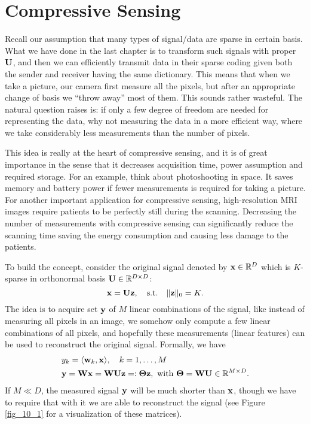 \documentclass[../book-template.tex]{subfiles}
\begin{document}
\section{Compressive Sensing}
Recall our assumption that many types of signal/data are sparse in certain basis. What we have done in the last chapter is to transform such signals with proper ${\bf U}$, and then we can efficiently transmit data in their sparse coding given both the sender and receiver having the same dictionary. This means that when we take a picture, our camera first measure all the pixels, but after an appropriate change of basis we ``throw away'' most of them. This sounds rather wasteful. The natural question raises is: if only a few degree of freedom are needed for representing the data, why not measuring the data in a more efficient way, where we take considerably less measurements than the number of pixels. 
\par This idea is really at the heart of compressive sensing, and it is of great importance in the sense that it decreases acquisition time, power assumption and required storage. For an example, think about photoshooting in space. It saves memory and battery power if fewer measurements is required for taking a picture. For another important application for compressive sensing, high-resolution MRI images require patients to be perfectly still during the scanning. Decreasing the number of measurements with compressive sensing can significantly reduce the scanning time saving the energy consumption and causing less damage to the patients.
\par To build the concept, consider the original signal denoted by ${\bf x}\in \mathbb{R}^D$ which is $K$-sparse in orthonormal basis ${\bf U}\in\mathbb{R}^{D\times D}$:
\begin{equation*}
	{\bf x}={\bf Uz},\quad {\rm s.t.}\quad \|{\bf z}\|_0=K.
\end{equation*}
The idea is to acquire set ${\bf y}$ of $M$ linear combinations of the signal, like instead of measuring all pixels in an image, we somehow only compute a few linear combinations of all pixels, and hopefully these measurements (linear features) can be used to reconstruct the original signal. Formally, we have
\begin{align*}
	&y_k=\langle {\bf w}_k,{\bf x}\rangle,\quad k=1,\dots,M\\
	&{\bf y}={\bf Wx}={\bf WUz}=:{\bf \Theta z},\ {\rm with}\ {\bf \Theta}={\bf WU}\in\mathbb{R}^{M\times D}.
\end{align*}
If $M\ll D$, the measured signal ${\bf y}$ will be much shorter than ${\bf x}$, though we have to require that with it we are able to reconstruct the signal (see Figure \ref{fig_10_1} for a visualization of these matrices).
\end{document}
